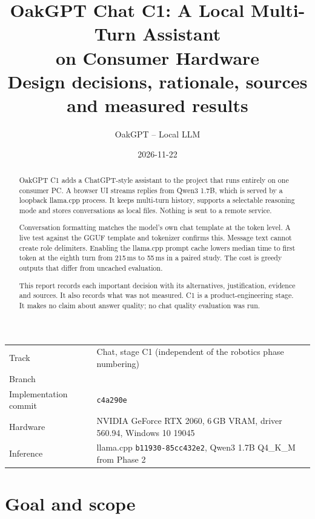 \documentclass[11pt,a4paper]{article}
\title{\textbf{OakGPT Chat C1: A Local Multi-Turn Assistant\\on Consumer Hardware}\\[4pt]
  \large Design decisions, rationale, sources and measured results}
\author{OakGPT -- Local LLM}
\date{2026-11-22}
\newcommand{\code}[1]{\texttt{#1}}
\begin{document}
\maketitle

\begin{center}
\small
\begin{tabularx}{0.9\textwidth}{@{}lY@{}}
\toprule
Track & Chat, stage C1 (independent of the robotics phase numbering) \\
Branch &  \\
Implementation commit & \code{c4a290e} \\
Hardware & NVIDIA GeForce RTX 2060, 6\,GB VRAM, driver 560.94, Windows 10 19045 \\
Inference & llama.cpp \code{b11930-85cc432e2}, Qwen3 1.7B Q4\_K\_M from Phase 2 \\
\bottomrule
\end{tabularx}
\end{center}

\begin{abstract}
\noindent OakGPT C1 adds a ChatGPT-style assistant to the project that runs entirely on
one consumer PC. A browser UI streams replies from Qwen3 1.7B, which is served by a
loopback llama.cpp process. It keeps multi-turn history, supports a selectable reasoning
mode and stores conversations as local files. Nothing is sent to a remote service.

Conversation formatting matches the model's own chat template at the token level. A live
test against the GGUF template and tokenizer confirms this. Message text cannot create
role delimiters. Enabling the llama.cpp prompt cache lowers median time to first token at
the eighth turn from 215\,ms to 55\,ms in a paired study. The cost is greedy outputs that
differ from uncached evaluation.

This report records each important decision with its alternatives, justification,
evidence and sources. It also records what was not measured. C1 is a
product-engineering stage. It makes no claim about answer quality; no chat quality
evaluation was run.
\end{abstract}

\tableofcontents

\section{Goal and scope}
\end{document}
